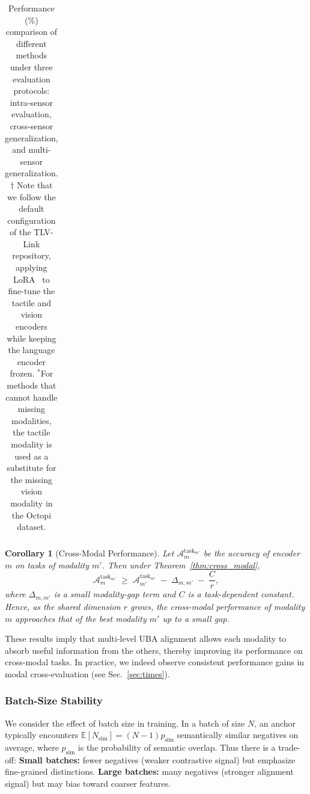 \documentclass[letterpaper]{article} %
\theoremstyle{definition}                %
\theoremstyle{plain}                     %
\newtheorem{corollary}[theorem]{Corollary}
\theoremstyle{remark}                    %
\begin{document}
\begin{table}[ht!]
\begin{tabular}{@{}c|c|c|ccc|c|c|
c@{}}
\end{tabular}%
\vspace{-0.3cm}
\caption{Performance (\%) comparison of different methods under three evaluation protocols: \colorbox[HTML]{F6E6E6}{intra-sensor evaluation}, \colorbox[HTML]{E2F0D9}{cross-sensor generalization}, and \colorbox[HTML]{E8F1F9}{multi-sensor generalization}. $\dag$ Note that we follow the default configuration of the TLV-Link repository, applying LoRA~\cite{hu2022lora} to fine-tune the tactile and vision encoders while keeping the language encoder frozen. $^\ast$For methods that cannot handle missing modalities, the tactile modality is used as a substitute for the missing vision modality in the Octopi dataset.}
\label{tab:main}
\vspace{-0.5cm}
\end{table}

\begin{corollary}[Cross-Modal Performance]
\label{cor:cross_eval}
Let $\mathcal{A}_m^{\mathrm{task}_{m'}}$ be the accuracy of encoder $m$ on tasks of modality $m'$. Then under Theorem~\ref{thm:cross_modal},
\begin{equation}
\mathcal{A}_m^{\mathrm{task}_{m'}} 
\;\ge\;\mathcal{A}_{m'}^{\mathrm{task}_{m'}} \;-\; \Delta_{m,m'} \;-\; 
\frac{C}{r},
\end{equation}
where $\Delta_{m,m'}$ is a small modality-gap term and $C$ is a task-dependent constant. Hence, as the shared dimension $r$ grows, the cross-modal performance of modality $m$ approaches that of the best modality $m'$ up to a small gap.
\end{corollary}

These results imply that multi-level UBA alignment allows each modality to absorb useful information from the others, thereby improving its performance on cross-modal tasks. In practice, we indeed observe consistent performance gains in modal cross-evaluation (see Sec.~\ref{sec:times}).




\subsubsection{Batch-Size Stability}
\label{sec:stability}

We consider the effect of batch size in training. In a batch of size $N$, an anchor typically encounters $\mathbb{E}[N_{\mathrm{sim}}]=(N-1)p_{\mathrm{sim}}$ semantically similar negatives on average, where $p_{\mathrm{sim}}$ is the probability of semantic overlap. Thus there is a trade-off: \textbf{Small batches:} fewer negatives (weaker contrastive signal) but emphasize fine-grained distinctions. \textbf{Large batches:} many negatives (stronger alignment signal) but may bias toward coarser features.
\end{document}

